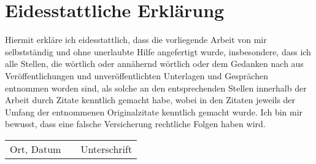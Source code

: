 \chapter*{Eidesstattliche Erklärung}
Hiermit erkläre ich eidesstattlich, dass die vorliegende Arbeit von mir selbstständig und ohne unerlaubte Hilfe angefertigt wurde, insbesondere, dass ich alle Stellen, die wörtlich oder annähernd wörtlich oder dem Gedanken nach aus Veröffentlichungen und unveröffentlichten Unterlagen und Gesprächen entnommen worden sind, als solche an den entsprechenden Stellen innerhalb der Arbeit durch Zitate kenntlich gemacht habe, wobei in den Zitaten jeweils der Umfang der entnommenen Originalzitate kenntlich gemacht wurde. Ich bin mir bewusst, dass eine falsche Versicherung rechtliche Folgen haben wird.
\vspace{3cm}

\begin{tabular}{p{}cp{}}
	\cline{1-1} \cline{3-3} \\
	\raggedright Ort, Datum & & \raggedright Unterschrift 
\end{tabular}














